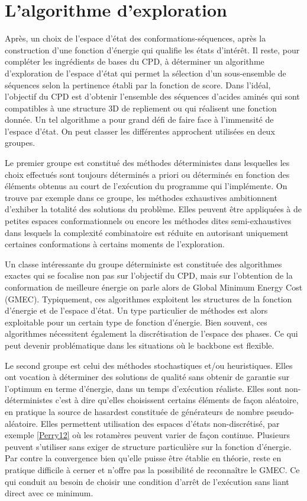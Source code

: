 \section{L'algorithme d'exploration}

Après, un choix de l'espace d'état des conformations-séquences, après la construction d'une fonction d'énergie qui qualifie les états d'intérêt. Il reste, pour compléter les ingrédients de bases du CPD, à déterminer un algorithme d'exploration de l'espace d'état qui permet la sélection d'un sous-ensemble de séquences selon la pertinence établi par la fonction de score. Dans l'idéal, l'objectif du CPD est d'obtenir l'ensemble des séquences d'acides aminés qui sont compatibles à une structure 3D de repliement ou qui réalisent une fonction donnée. Un tel algorithme a pour grand défi de faire face à l'immensité de l'espace d'état. On peut classer les différentes approchent utilisées en deux groupes.

Le premier groupe est constitué des méthodes déterministes dans lesquelles les choix effectués sont toujours déterminés a priori ou déterminés en fonction des éléments obtenus au court de l'exécution du programme qui l'implémente. On trouve par exemple dans ce groupe, les méthodes exhaustives ambitionnent d'exhiber la totalité des solutions du problème. Elles peuvent être appliquées à de petites espaces conformationnels ou encore les méthodes dites semi-exhaustives dans lesquels la complexité combinatoire est réduite en autorisant uniquement certaines conformations à certains moments de l'exploration.

Un classe intéressante du groupe déterministe est constituée des algorithmes exactes qui se focalise non pas sur l'objectif du CPD, mais sur l'obtention de la conformation de meilleure énergie on parle alors de \og Global Minimum Energy Cost \fg (GMEC).
Typiquement, ces algorithmes exploitent les structures de la fonction d'énergie et de l'espace d'état. Un type particulier de méthodes est alors exploitable pour un certain type de fonction d'énergie. Bien souvent, ces algorithmes nécessitent également la discrétisation de l'espace des phases. Ce qui peut devenir problématique dans les situations où le backbone est flexible.
  
Le second groupe est celui des méthodes stochastiques et/ou heuristiques. Elles ont vocation à déterminer des solutions de qualité sans obtenir de garantie sur l'optimum en terme d'énergie, dans un temps d'exécution réaliste. Elles sont non-déterministes c'est à dire qu'elles choisissent certains éléments de façon aléatoire, en pratique la \og source de hasard\fg est constituée de générateurs de nombre pseudo-aléatoire. Elles permettent utilisation des espaces d'états non-discrétisé, par exemple \ref{Perry12} où les rotamères peuvent varier de façon continue. Plusieurs peuvent s'utiliser sans exiger de structure particulière sur la fonction d'énergie. Par contre la convergence bien qu'elle puisse être établie en théorie, reste en pratique difficile à cerner et n'offre pas la possibilité de reconnaître le GMEC. Ce qui conduit au besoin de choisir une condition d'arrêt de l'exécution sans liant direct avec ce minimum.  

